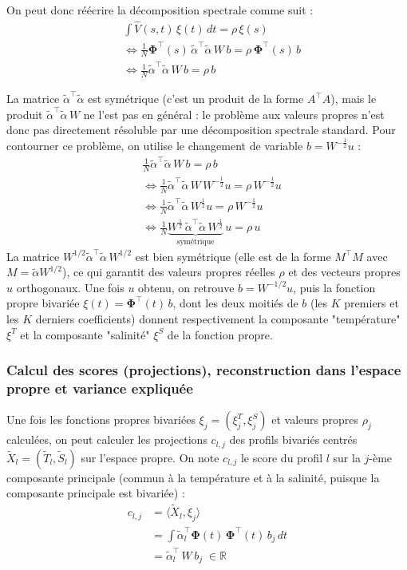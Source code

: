 \documentclass[11pt,a4paper,oneside]{report}
\begin{document}
	On peut donc réécrire la décomposition spectrale comme suit :
	\begin{align*}
		& \int \hat{V}(s, t)\,\xi(t)\,dt = \rho\, \xi(s)\\
		& \iff \frac{1}{N}\boldsymbol{\Phi}^\top(s)\,\tilde{\alpha}^\top \tilde{\alpha}\, W\, b = \rho\, \boldsymbol{\Phi}^\top(s)\, b\\
		& \iff \frac{1}{N} \tilde{\alpha}^\top \tilde{\alpha}\, W\, b = \rho\, b
	\end{align*}
	
	La matrice $\tilde\alpha^\top\tilde\alpha$ est symétrique (c'est un produit de la forme $A^\top A$), mais le produit $\tilde\alpha^\top\tilde\alpha\, W$ ne l'est pas en général : le problème aux valeurs propres n'est donc pas directement résoluble par une décomposition spectrale standard. Pour contourner ce problème, on utilise le changement de variable $b = W^{-\frac{1}{2}} u$ :
	\begin{align*}
		& \frac 1 N \tilde{\alpha}^\top \tilde{\alpha}\, W\, b = \rho\, b\\
		& \iff \frac 1 N \tilde{\alpha}^\top \tilde{\alpha}\, W\, W^{-\frac 1 2}u = \rho\, W^{-\frac 1 2}u\\
		& \iff \frac 1 N \tilde{\alpha}^\top \tilde{\alpha}\, W^{\frac{1}{2}} u = \rho\, W^{-\frac{1}{2}} u \\
		& \iff \frac 1 N \underbrace{W^{\frac 1 2}\, \tilde{\alpha}^\top \tilde{\alpha}\, W^{\frac 1 2}}_{\text{symétrique}}\, u = \rho\, u
	\end{align*}
	La matrice $W^{1/2}\tilde\alpha^\top\tilde\alpha\, W^{1/2}$ est bien symétrique (elle est de la forme $M^\top M$ avec $M = \tilde\alpha W^{1/2}$), ce qui garantit des valeurs propres réelles $\rho$ et des vecteurs propres $u$ orthogonaux. Une fois $u$ obtenu, on retrouve $b = W^{-1/2} u$, puis la fonction propre bivariée $\xi(t) = \boldsymbol{\Phi}^\top(t)\, b$, dont les deux moitiés de $b$ (les $K$ premiers et les $K$ derniers coefficients) donnent respectivement la composante "température" $\xi^T$ et la composante "salinité" $\xi^S$ de la fonction propre.
	
	\subsubsection{ Calcul des scores (projections), reconstruction dans l'espace propre et variance expliquée}
	Une fois les fonctions propres bivariées $\xi_j = (\xi_j^T, \xi_j^S)$ et valeurs propres $\rho_j$ calculées, on peut calculer les projections $c_{l,j}$ des profils bivariés centrés $\tilde X_l = (\tilde T_l, \tilde S_l)$ sur l'espace propre. On note $c_{l,j}$ le score du profil $l$ sur la $j$-ème composante principale (commun à la température et à la salinité, puisque la composante principale est bivariée) :
	\begin{align*}
		c_{l, j} &= \langle \tilde X_l, \xi_j\rangle \\
		&= \int \tilde\alpha_l^\top \boldsymbol{\Phi}(t)\, \boldsymbol{\Phi}^\top(t)\, b_j \, dt \\ 
		&= \tilde \alpha_l^\top\, W\, b_j \;\in \mathbb{R}
	\end{align*}
	
\end{document}
